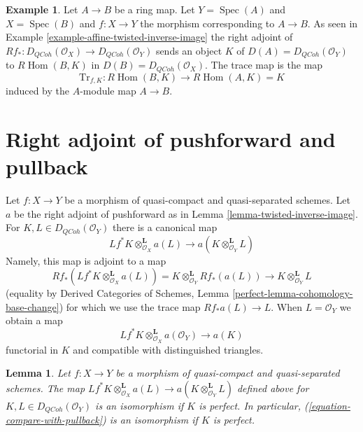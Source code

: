 \documentclass{stacks-project}
\theoremstyle{plain}
\newtheorem{lemma}[subsection]{Lemma}
\theoremstyle{definition}
\newtheorem{example}[subsection]{Example}
\theoremstyle{remark}
\numberwithin{equation}{subsection}
\def\Spec{\mathop{\mathrm{Spec}}}
\def\Hom{\mathop{\mathrm{Hom}}\nolimits}
\def\QCoh{\mathit{QCoh}}
\begin{document}
\begin{example}
\label{example-trace-affine}
Let $A \to B$ be a ring map. Let $Y = \Spec(A)$ and $X = \Spec(B)$
and $f : X \to Y$ the morphism corresponding to $A \to B$. As seen
in Example \ref{example-affine-twisted-inverse-image}
the right adjoint of
$Rf_* : D_\QCoh(\mathcal{O}_X) \to D_\QCoh(\mathcal{O}_Y)$
sends an object $K$ of $D(A) = D_\QCoh(\mathcal{O}_Y)$ to $R\Hom(B, K)$ in
$D(B) = D_\QCoh(\mathcal{O}_X)$. The trace map is the map
$$
\text{Tr}_{f, K} : R\Hom(B, K) \longrightarrow R\Hom(A, K) = K
$$
induced by the $A$-module map $A \to B$.
\end{example}




\section{Right adjoint of pushforward and pullback}
\label{section-compare-with-pullback}

\noindent
Let $f : X \to Y$ be a morphism of quasi-compact and quasi-separated
schemes. Let $a$ be the right adjoint of pushforward as in
Lemma \ref{lemma-twisted-inverse-image}. For $K, L \in D_\QCoh(\mathcal{O}_Y)$
there is a canonical map
$$
Lf^*K \otimes^\mathbf{L}_{\mathcal{O}_X} a(L)
\longrightarrow
a(K \otimes_{\mathcal{O}_Y}^\mathbf{L} L)
$$
Namely, this map is adjoint to a map
$$
Rf_*(Lf^*K \otimes^\mathbf{L}_{\mathcal{O}_X} a(L)) =
K \otimes^\mathbf{L}_{\mathcal{O}_Y} Rf_*(a(L))
\longrightarrow
K \otimes^\mathbf{L}_{\mathcal{O}_Y} L
$$
(equality by Derived Categories of Schemes, Lemma
\ref{perfect-lemma-cohomology-base-change})
for which we use the trace map $Rf_*a(L) \to L$.
When $L = \mathcal{O}_Y$ we obtain a map
\begin{equation}
\label{equation-compare-with-pullback}
Lf^*K \otimes^\mathbf{L}_{\mathcal{O}_X} a(\mathcal{O}_Y) \longrightarrow a(K)
\end{equation}
functorial in $K$ and compatible with distinguished triangles.

\begin{lemma}
\label{lemma-compare-with-pullback-perfect}
Let $f : X \to Y$ be a morphism of quasi-compact and quasi-separated
schemes. The map
$Lf^*K \otimes^\mathbf{L}_{\mathcal{O}_X} a(L) \to
a(K \otimes_{\mathcal{O}_Y}^\mathbf{L} L)$
defined above for $K, L \in D_\QCoh(\mathcal{O}_Y)$
is an isomorphism if $K$ is perfect. In particular,
(\ref{equation-compare-with-pullback}) is an isomorphism if $K$ is perfect.
\end{lemma}
\end{document}
